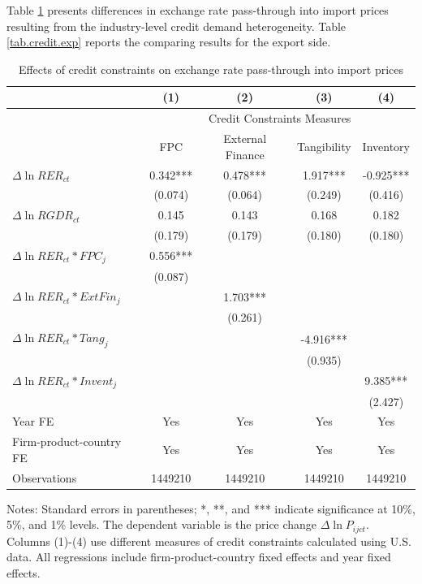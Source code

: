 \documentclass[12pt]{article}
\begin{document}
Table \ref{tab.credit} presents differences in exchange rate pass-through into import prices resulting from the industry-level credit demand heterogeneity. Table \ref{tab.credit.exp} reports the comparing results for the export side. 

\begin{table}[htbp]
	\centering
	\caption{Effects of credit constraints on exchange rate pass-through into import prices}
	\begin{threeparttable}	
		\begin{tabular}{lcccc}
			\toprule
			& (1)   & (2)   & (3)   & (4) \\
			\midrule
			 & \multicolumn{4}{c}{Credit Constraints Measures} \\
			& FPC   & External Finance & Tangibility & Inventory \\
			\midrule
			$\Delta \ln RER_{ct}$ & 0.342*** & 0.478*** & 1.917*** & -0.925*** \\
			& (0.074) & (0.064) & (0.249) & (0.416) \\
			$\Delta \ln RGDR_{ct}$ & 0.145 & 0.143 & 0.168 & 0.182 \\
			& (0.179) & (0.179) & (0.180) & (0.180) \\
			$\Delta \ln RER_{ct}*FPC_{j}$ & 0.556*** &       &       &  \\
			& (0.087) &       &       &  \\
			$\Delta \ln RER_{ct}*ExtFin_{j}$ &       & 1.703*** &       &  \\
			&       & (0.261) &       &  \\
			$\Delta \ln RER_{ct}*Tang_{j}$ &       &       & -4.916*** &  \\
			&       &       & (0.935) &  \\
			$\Delta \ln RER_{ct}*Invent_{j}$ &       &       &       & 9.385*** \\
			&       &       &       & (2.427) \\
			Year FE  & Yes   & Yes   & Yes   & Yes \\
			Firm-product-country FE & Yes   & Yes   & Yes   & Yes \\
			Observations & 1449210 & 1449210 & 1449210 & 1449210 \\
			\bottomrule
		\end{tabular}
		\begin{tablenotes}
			\footnotesize
			\item[Notes:] Standard errors in parentheses; *, **, and *** indicate significance at 10\%, 5\%, and 1\% levels. The dependent variable is the price change $\Delta \ln P_{ijct}$. Columns (1)-(4) use different measures of credit constraints calculated using U.S. data. All regressions include firm-product-country fixed effects and year fixed effects.
		\end{tablenotes}
	\end{threeparttable}
	\label{tab.credit}
\end{table}
\end{document}
